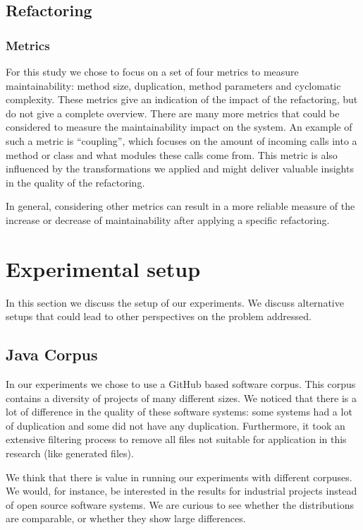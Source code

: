\subsection{Refactoring}


\subsubsection{Metrics}
For this study we chose to focus on a set of four metrics to measure maintainability: method size, duplication, method parameters and cyclomatic complexity. These metrics give an indication of the impact of the refactoring, but do not give a complete overview. There are many more metrics that could be considered to measure the maintainability impact on the system. An example of such a metric is ``coupling'', which focuses on the amount of incoming calls into a method or class and what modules these calls come from. This metric is also influenced by the transformations we applied and might deliver valuable insights in the quality of the refactoring.

In general, considering other metrics can result in a more reliable measure of the increase or decrease of maintainability after applying a specific refactoring.

\section{Experimental setup}%
In this section we discuss the setup of our experiments. We discuss alternative setups that could lead to other perspectives on the problem addressed.

\subsection{Java Corpus}
In our experiments we chose to use a GitHub based software corpus. This corpus contains a diversity of projects of many different sizes. We noticed that there is a lot of difference in the quality of these software systems: some systems had a lot of duplication and some did not have any duplication. Furthermore, it took an extensive filtering process to remove all files not suitable for application in this research (like generated files).

We think that there is value in running our experiments with different corpuses. We would, for instance, be interested in the results for industrial projects instead of open source software systems. We are curious to see whether the distributions are comparable, or whether they show large differences.

